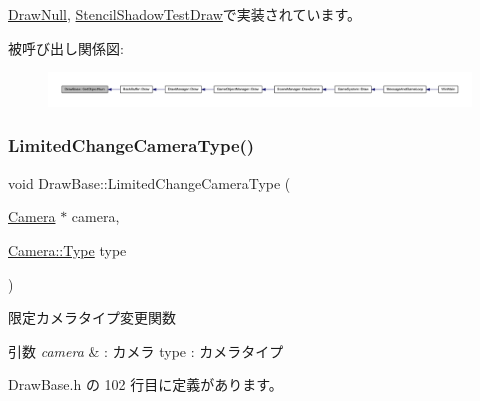 \mbox{\hyperlink{class_draw_null_aaffa15d184f1d09512ccaa3bdad3f658}{Draw\+Null}}, \mbox{\hyperlink{class_stencil_shadow_test_draw_a8cc9a54a2bcb1fd006331fca1add02dc}{Stencil\+Shadow\+Test\+Draw}}で実装されています。

被呼び出し関係図\+:
\nopagebreak
\begin{figure}[H]
\begin{center}
\leavevmode
\includegraphics[width=350pt]{class_draw_base_aed79e9db49de4fa2dff064495b877bcd_icgraph}
\end{center}
\end{figure}
\mbox{\label{class_draw_base_aa18abd488181eed72822f92a0f2521fe}} 
\subsubsection{\texorpdfstring{Limited\+Change\+Camera\+Type()}{LimitedChangeCameraType()}}
{\footnotesize\ttfamily void Draw\+Base\+::\+Limited\+Change\+Camera\+Type (\begin{DoxyParamCaption}\item[{\mbox{\hyperlink{class_camera}{Camera}} $\ast$}]{camera,  }\item[{\mbox{\hyperlink{class_camera_a3b0a1f58deca679ac665f61c480d1dcb}{Camera\+::\+Type}}}]{type }\end{DoxyParamCaption})\hspace{0.3cm}{\ttfamily [inline]}}



限定カメラタイプ変更関数 


\begin{DoxyParams}{引数}
{\em camera} & \+: カメラ type \+: カメラタイプ \\
\hline
\end{DoxyParams}


 Draw\+Base.\+h の 102 行目に定義があります。

